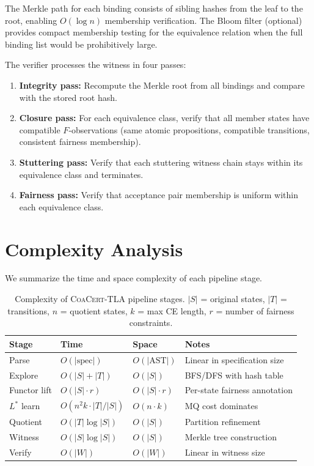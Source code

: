 \documentclass[11pt]{article}
\newcommand{\CoaCert}{\textsc{CoaCert-TLA}}
\begin{document}
The Merkle path for each binding consists of sibling hashes from the
leaf to the root, enabling $O(\log n)$ membership verification.
The Bloom filter (optional) provides compact membership testing for the
equivalence relation when the full binding list would be prohibitively large.

The verifier processes the witness in four passes:
\begin{enumerate}[nosep]
\item \textbf{Integrity pass:} Recompute the Merkle root from all bindings
  and compare with the stored root hash.
\item \textbf{Closure pass:} For each equivalence class, verify that all
  member states have compatible $F$-observations (same atomic propositions,
  compatible transitions, consistent fairness membership).
\item \textbf{Stuttering pass:} Verify that each stuttering witness chain
  stays within its equivalence class and terminates.
\item \textbf{Fairness pass:} Verify that acceptance pair membership is
  uniform within each equivalence class.
\end{enumerate}

\section{Complexity Analysis}
\label{app:complexity}

We summarize the time and space complexity of each pipeline stage.

\begin{table}[h]
\centering
\caption{Complexity of \CoaCert{} pipeline stages.  $|S|$ = original states,
  $|T|$ = transitions, $n$ = quotient states, $k$ = max CE length, $r$ =
  number of fairness constraints.}
\label{tab:complexity}
\small
\begin{tabular}{@{}llll@{}}
\toprule
\textbf{Stage} & \textbf{Time} & \textbf{Space} & \textbf{Notes} \\
\midrule
Parse        & $O(|\text{spec}|)$  & $O(|\text{AST}|)$  & Linear in specification size \\
Explore      & $O(|S| + |T|)$     & $O(|S|)$           & BFS/DFS with hash table \\
Functor lift & $O(|S| \cdot r)$   & $O(|S| \cdot r)$   & Per-state fairness annotation \\
$L^*$ learn  & $O(n^2 k \cdot |T|/|S|)$ & $O(n \cdot k)$ & MQ cost dominates \\
Quotient     & $O(|T| \log |S|)$  & $O(|S|)$           & Partition refinement \\
Witness      & $O(|S| \log |S|)$  & $O(|S|)$           & Merkle tree construction \\
Verify       & $O(|W|)$           & $O(|W|)$           & Linear in witness size \\
\bottomrule
\end{tabular}
\end{table}
\end{document}
